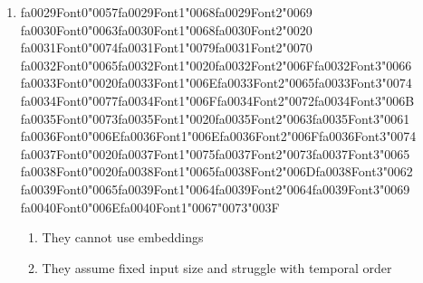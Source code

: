 \documentclass[12pt]{article}
\begin{document}
\begin{enumerate}[label=Q\arabic*.]
\begin{enumerate}[label=(\Alph*)]
    \item To ensure the output values sum to 1, representing a probability distribution
    \item To prevent the gradients from exploding
    \item To increase the speed of the training process
    \item To allow the model to handle variable-length sequences
\end{enumerate}
\item {\csname fa0029Font0\endcsname\char"0057}{\csname fa0029Font1\endcsname\char"0068}{\csname fa0029Font2\endcsname\char"0069} {\csname fa0030Font0\endcsname\char"0063}{\csname fa0030Font1\endcsname\char"0068}{\csname fa0030Font2\endcsname\char"0020} {\csname fa0031Font0\endcsname\char"0074}{\csname fa0031Font1\endcsname\char"0079}{\csname fa0031Font2\endcsname\char"0070} {\csname fa0032Font0\endcsname\char"0065}{\csname fa0032Font1\endcsname\char"0020}{\csname fa0032Font2\endcsname\char"006F}{\csname fa0032Font3\endcsname\char"0066} {\csname fa0033Font0\endcsname\char"0020}{\csname fa0033Font1\endcsname\char"006E}{\csname fa0033Font2\endcsname\char"0065}{\csname fa0033Font3\endcsname\char"0074} {\csname fa0034Font0\endcsname\char"0077}{\csname fa0034Font1\endcsname\char"006F}{\csname fa0034Font2\endcsname\char"0072}{\csname fa0034Font3\endcsname\char"006B} {\csname fa0035Font0\endcsname\char"0073}{\csname fa0035Font1\endcsname\char"0020}{\csname fa0035Font2\endcsname\char"0063}{\csname fa0035Font3\endcsname\char"0061} {\csname fa0036Font0\endcsname\char"006E}{\csname fa0036Font1\endcsname\char"006E}{\csname fa0036Font2\endcsname\char"006F}{\csname fa0036Font3\endcsname\char"0074} {\csname fa0037Font0\endcsname\char"0020}{\csname fa0037Font1\endcsname\char"0075}{\csname fa0037Font2\endcsname\char"0073}{\csname fa0037Font3\endcsname\char"0065} {\csname fa0038Font0\endcsname\char"0020}{\csname fa0038Font1\endcsname\char"0065}{\csname fa0038Font2\endcsname\char"006D}{\csname fa0038Font3\endcsname\char"0062} {\csname fa0039Font0\endcsname\char"0065}{\csname fa0039Font1\endcsname\char"0064}{\csname fa0039Font2\endcsname\char"0064}{\csname fa0039Font3\endcsname\char"0069} {\csname fa0040Font0\endcsname\char"006E}{\csname fa0040Font1\endcsname\char"0067}{\char"0073}{\char"003F}
\begin{enumerate}[label=(\Alph*)]
    \item They cannot use embeddings
    \item They assume fixed input size and struggle with temporal order

\end{enumerate}
\end{enumerate}
\end{document}

